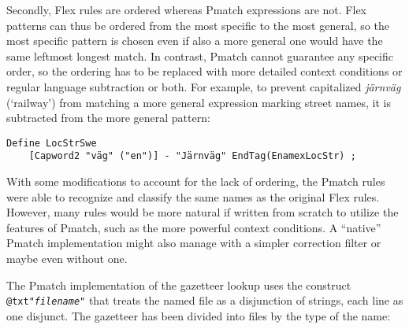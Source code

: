 \documentclass{llncs}
\begin{document}
Secondly, Flex rules are ordered whereas Pmatch expressions are not.
Flex patterns can thus be ordered from the most
specific to the most general, so the most specific pattern is
chosen even if also a more general one would have the same
leftmost longest match. In contrast,
Pmatch cannot guarantee any specific order, so the ordering has to be
replaced with more detailed context conditions or regular language
subtraction or both. For example, to prevent capitalized
\textit{järnväg} (`railway') from matching a more general expression
marking street names, it is subtracted from the more general pattern:
%
\begin{verbatim}
Define LocStrSwe
    [Capword2 "väg" ("en")] - "Järnväg" EndTag(EnamexLocStr) ;
\end{verbatim}

With some modifications to account for the lack of ordering, the
Pmatch rules were able to recognize and classify the same names as the
original Flex rules. However, many rules would be more natural if
written from scratch to utilize the features of Pmatch, such as the
more powerful context conditions. A ``native'' Pmatch implementation
might also manage with a simpler correction filter or maybe even
without one.



\begin{sloppypar}
The Pmatch implementation of the gazetteer lookup uses the construct
\texttt{@txt"\textit{filename}"} that treats the named file as a
disjunction of strings, each line as one disjunct. The gazetteer has
been divided into files by the type of the name:
\end{sloppypar}
\end{document}

